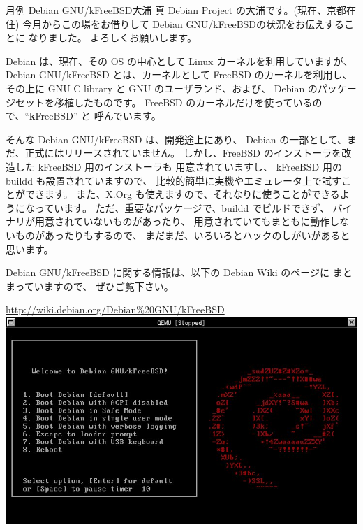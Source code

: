 \documentclass[mingoth,a4paper]{jsarticle}
\begin{document}
\begin{getsureiupdate}{月例 Debian GNU/kFreeBSD}{大浦 真}
  Debian Project の大浦です。(現在、京都在住)
  今月からこの場をお借りして Debian GNU/kFreeBSDの状況をお伝えすることに
  なりました。
  よろしくお願いします。

  Debian は、現在、その OS の中心として Linux カーネルを利用していますが、
  Debian GNU/kFreeBSD とは、カーネルとして FreeBSD のカーネルを利用し、
  その上に GNU C library と GNU のユーザランド、および、
  Debian のパッケージセットを移植したものです。
  FreeBSD のカーネルだけを使っているので、``\textbf{k}FreeBSD'' と
  呼んでいます。

  そんな Debian GNU/kFreeBSD は、開発途上にあり、
  Debian の一部として、まだ、正式にはリリースされていません。
  しかし、FreeBSD のインストーラを改造した kFreeBSD 用のインストーラも
  用意されていますし、
  kFreeBSD 用の buildd も設置されていますので、
  比較的簡単に実機やエミュレータ上で試すことができます。
  また、X.Org も使えますので、それなりに使うことができるようになっています。
  ただ、重要なパッケージで、buildd でビルドできず、
  バイナリが用意されていないものがあったり、
  用意されていてもまともに動作しないものがあったりもするので、
  まだまだ、いろいろとハックのしがいがあると思います。

  Debian GNU/kFreeBSD に関する情報は、以下の Debian Wiki のページに
  まとまっていますので、
  ぜひご覧下さい。

  \url{http://wiki.debian.org/Debian%20GNU/kFreeBSD}
\includegraphics[width=1\hsize]{image200805/qemu-kfreebsd01.jpg}
\end{getsureiupdate}
\end{document}

